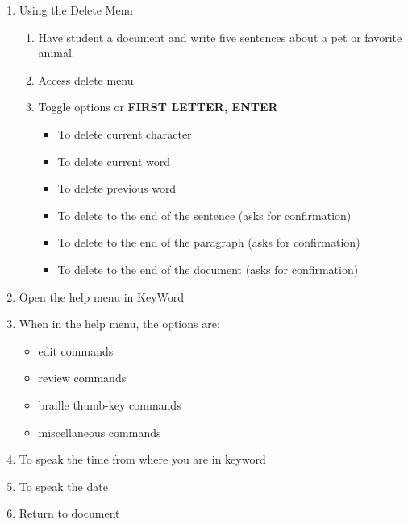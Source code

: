 \documentclass[10pt,letterpaper,twoside]{report}
\begin{document}
{{{\begin{enumerate}
\begin{enumerate}
    	    \item Write ``Math''
    	    \item exit the document 
	    \end{enumerate}
	\item Using the Delete Menu
	    \begin{enumerate} 
	    \item Have student a document and write five sentences about a pet or favorite animal.
	    \item Access delete menu 
	   \item Toggle options  or {\textcolor{accent}{\MakeUppercase{\textbf{first letter, enter}}}}
	    \begin{itemize}
	    \item To delete current character 
	    \item To delete current word 
	    \item To delete previous word 
	    \item To delete to the end of the sentence (asks for confirmation)  
	    \item To delete to the end of the paragraph (asks for confirmation) 
	    \item To delete to the end of the document (asks for confirmation) 
	    \end{itemize}
	\end{enumerate}
	\item Open the help menu in KeyWord 
	\item When in the help menu, the options are:
	    \begin{itemize}
	    \item edit commands
	    \item review commands
	    \item braille thumb-key commands
	    \item miscellaneous commands
	    \end{itemize}
	\item To speak the time from where you are in keyword 
	\item To speak the date 
	\item Return to document 
\end{enumerate}
\clearpage
}}}
\end{document}
